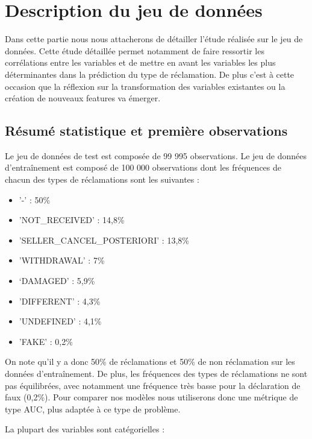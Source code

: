 
\chapter{Description du jeu de données}

Dans cette partie nous nous attacherons de détailler l'étude réalisée sur le jeu de données.
Cette étude détaillée permet notamment de faire ressortir les corrélations entre les variables
et de mettre en avant les variables les plus déterminantes dans la prédiction du type de 
réclamation. De plus c'est à cette occasion que la réflexion sur la transformation des variables
existantes ou la création de nouveaux features va émerger.

\section{Résumé statistique et première observations}

Le jeu de données de test est composée de 99 995 observations.
Le jeu de données d'entraînement est composé de 100 000 observations dont les fréquences 
de chacun des types de réclamations sont les suivantes :

\begin{itemize}
\item '-' : 50\% 
\item 'NOT_RECEIVED' : 14,8\%
\item 'SELLER_CANCEL_POSTERIORI' : 13,8\%
\item 'WITHDRAWAL' : 7\%
\item ‘DAMAGED' : 5,9\%
\item 'DIFFERENT' : 4,3\%
\item 'UNDEFINED' : 4,1\%
\item 'FAKE' : 0,2\%
\end{itemize}

On note qu'il y a donc 50\% de réclamations et 50\% de non réclamation sur les données 
d'entraînement. De plus, les fréquences des types de réclamations ne sont pas équilibrées,
avec notamment une fréquence très basse pour la déclaration de faux (0,2\%). Pour comparer
nos modèles nous utiliserons donc une métrique de type AUC, plus adaptée à ce type de 
problème. 

La plupart des variables sont catégorielles :

